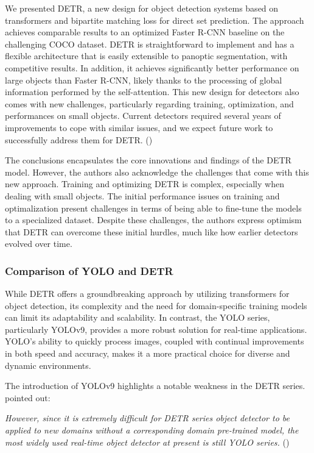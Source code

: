 \begin{myquote}
    We presented DETR, a new design for object detection systems based on transformers and bipartite matching loss for direct set prediction. The approach achieves comparable results to an optimized Faster R-CNN baseline on the challenging COCO dataset. DETR is straightforward to implement and has a flexible architecture that is easily extensible to panoptic segmentation, with competitive results. In addition, it achieves significantly better performance on large objects than Faster R-CNN, likely thanks to the processing of global information performed by the self-attention. This new design for detectors also comes with new challenges, particularly regarding training, optimization, and performances on small objects. Current detectors required several years of improvements to cope with similar issues, and we expect future work to successfully address them for DETR. (\cite{carion2020endtoend})
\end{myquote}

The conclusions encapsulates the core innovations and findings of the DETR model. However, the authors also acknowledge the challenges that come with this new approach. Training and optimizing DETR is complex, especially when dealing with small objects. The initial performance issues on training and optimalization present challenges in terms of being able to fine-tune the models to a specialized dataset. Despite these challenges, the authors express optimism that DETR can overcome these initial hurdles, much like how earlier detectors evolved over time. 

\subsubsection{Comparison of YOLO and DETR}

While DETR offers a groundbreaking approach by utilizing transformers for object detection, its complexity and the need for domain-specific training models can limit its adaptability and scalability. In contrast, the YOLO series, particularly YOLOv9, provides a more robust solution for real-time applications. YOLO's ability to quickly process images, coupled with continual improvements in both speed and accuracy, makes it a more practical choice for diverse and dynamic environments.

The introduction of YOLOv9 highlights a notable weakness in the DETR series. \citeauthor{wa2024yolov9} pointed out:

\textit{However, since it is extremely difficult for DETR series object detector to be applied to new domains without a corresponding domain pre-trained model, the most widely used real-time object detector at present is still YOLO series.} (\citeyear{wa2024yolov9})

